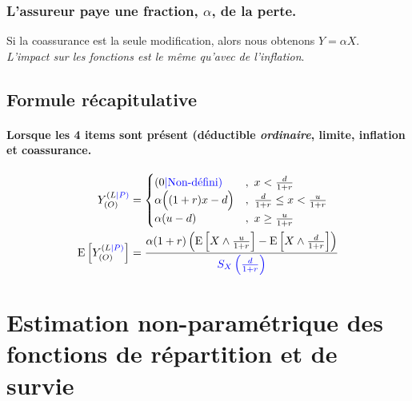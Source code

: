 \documentclass[10pt, french]{article}
\begin{document}
\begin{multicols*}{3}
\subsubsection*{L'assureur paye une fraction, $\alpha$, de la perte.}

Si la coassurance est la seule modification, alors nous obtenons $Y = \alpha X$. \\
\textit{L'impact sur les fonctions est le même qu'avec de l'inflation}.

\subsection*{Formule récapitulative}
\paragraph{Lorsque les 4 items sont présent (déductible \textit{ordinaire}, limite, inflation et coassurance.}

\begin{align*}
Y^{(L\textcolor{blue}{|P)}}_{(O)} &= 
\begin{cases}
(0 {\color{blue}{| \text{Non-défini})}}		& ,\ x  < \frac{d}{1+r} \\
\alpha \Big( (1+r) x - d \Big)	& ,\ \frac{d}{1+r} \leq x < \frac{u}{1+r} \\
\alpha (u-d)		& ,\ x \geq \frac{u}{1+r} 
\\
\end{cases}
\\
\mathrm{E} \left[ Y^{(L\textcolor{blue}{|P)}}_{(O)} \right] &= \frac{\alpha (1+r) \left( \mathrm{E} \left[ X \wedge \frac{u}{1+r} \right] - \mathrm{E} \left[ X \wedge \frac{d}{1+r} \right]   \right)}{{\color{blue}{S_X \left( \frac{d}{1+r} \right)}}} 
\end{align*}

\setcounter{section}{13}
\section{Estimation non-paramétrique des fonctions de répartition et de survie}


\end{multicols*}
\end{document}
